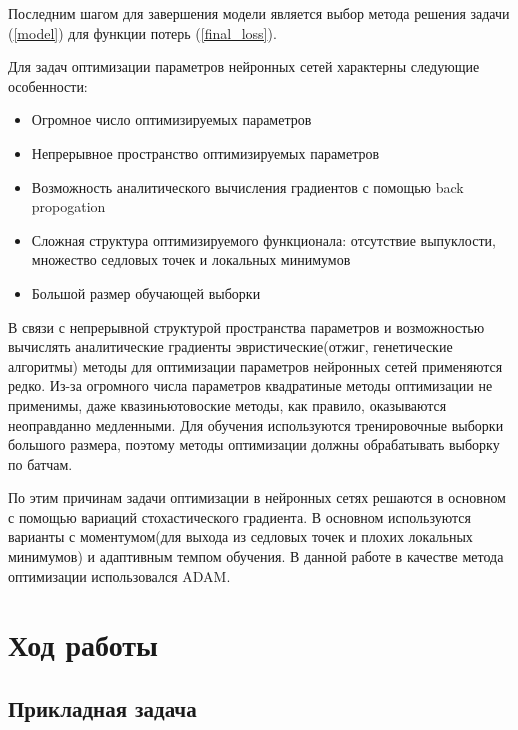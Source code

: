 \documentclass[14pt, a4paper, oneside, bold]{extarticle}
\begin{document}
Последним шагом для завершения модели является выбор метода решения 
задачи (\ref{model}) для функции потерь (\ref{final_loss}).

Для задач оптимизации параметров нейронных сетей характерны следующие особенности:
\begin{itemize}
	\item Огромное число оптимизируемых параметров
	
	\item Непрерывное пространство оптимизируемых параметров
	
	\item Возможность аналитического вычисления градиентов с помощью
back propogation
		
	\item Сложная структура оптимизируемого функционала: отсутствие 	выпуклости, множество седловых точек и локальных минимумов
	
	\item Большой размер обучающей выборки  
\end{itemize} 
	
В связи с непрерывной структурой пространства параметров и возможностью вычислять аналитические градиенты эвристические(отжиг, генетические алгоритмы) методы для оптимизации параметров нейронных сетей применяются редко. Из-за огромного числа параметров квадратиные методы оптимизации не применимы, даже квазиньютовоские методы, как правило, оказываются неоправданно медленными. Для обучения используются тренировочные выборки большого размера, поэтому методы оптимизации должны обрабатывать выборку по батчам. 

По этим причинам задачи оптимизации в нейронных сетях решаются в основном с помощью вариаций стохастического градиента. В основном используются варианты с моментумом(для выхода из седловых точек и плохих локальных минимумов) и адаптивным темпом обучения. В данной работе в качестве метода оптимизации использовался ADAM.

\newpage


\section{Ход работы}

\subsection{Прикладная задача}
\end{document}
